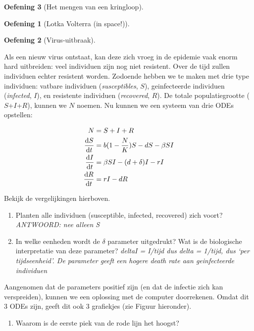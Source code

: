 \documentclass[
  a4paper,
]{scrbook}
\providecommand{\tightlist}{%
  \setlength{\itemsep}{0pt}\setlength{\parskip}{0pt}}\usepackage{longtable,booktabs,array}
\theoremstyle{definition}
\newtheorem{exercise}{Oefening}[chapter]
\theoremstyle{remark}
\begin{document}
\begin{exercise}[Het mengen van een
kringloop]
\begin{exercise}[Lotka Volterra (in
space!)]
\end{exercise}

\begin{exercise}[Virus-uitbraak]\protect\hypertarget{exr-virusuitbraak}{}\label{exr-virusuitbraak}

Als een nieuw virus ontstaat, kan deze zich vroeg in de epidemie vaak
enorm hard uitbreiden: veel individuen zijn nog niet resistent. Over de
tijd zullen individuen echter resistent worden. Zodoende hebben we te
maken met drie type individuen: vatbare individuen (\emph{susceptibles},
\(S\)), geinfecteerde individuen (\emph{infected}, \(I\)), en resistente
individuen (\emph{recovered}, \(R\)). De totale populatiegrootte
(\(S\)+\(I\)+\(R\)), kunnen we \(N\) noemen. Nu kunnen we een systeem
van drie ODEs opstellen:

\begin{align}
N &= S+I+R\\
\mathchoice{\frac{\mathrm{d}S}
{\mathrm{d}t}}{\mathrm{d}S/\mathrm{d}t}
{\mathrm{d}S/\mathrm{d}t}
{\mathrm{d}S/\mathrm{d}t} &= b(1-\frac{N}{K})S - dS - \beta S I \\
\mathchoice{\frac{\mathrm{d}I}
{\mathrm{d}t}}{\mathrm{d}I/\mathrm{d}t}
{\mathrm{d}I/\mathrm{d}t}
{\mathrm{d}I/\mathrm{d}t} &= \beta SI - (d+\delta)I - rI \\
\mathchoice{\frac{\mathrm{d}R}
{\mathrm{d}t}}{\mathrm{d}R/\mathrm{d}t}
{\mathrm{d}R/\mathrm{d}t}
{\mathrm{d}R/\mathrm{d}t} &= rI - dR
\end{align}

Bekijk de vergelijkingen hierboven.

\begin{enumerate}
\def\labelenumi{\alph{enumi}.}
\item
  Planten alle individuen (susceptible, infected, recovered) zich voort?
  \emph{ANTWOORD: nee alleen S}
\item
  In welke eenheden wordt de \(\delta\) parameter uitgedrukt? Wat is de
  biologische interpretatie van deze parameter? \emph{deltaI = I/tijd
  dus delta = 1/tijd, dus `per tijdseenheid'. De parameter geeft een
  hogere death rate aan geinfecteerde individuen}
\end{enumerate}

Aangenomen dat de parameters positief zijn (en dat de infectie zich kan
verspreiden), kunnen we een oplossing met de computer doorrekenen. Omdat
dit 3 ODEs zijn, geeft dit ook 3 grafiekjes (zie Figuur hieronder).

\begin{enumerate}
\def\labelenumi{\alph{enumi}.}
\setcounter{enumi}{2}
\tightlist
\item
  Waarom is de eerste piek van de rode lijn het hoogst?
\end{enumerate}


\end{exercise}
\end{exercise}
\end{document}
